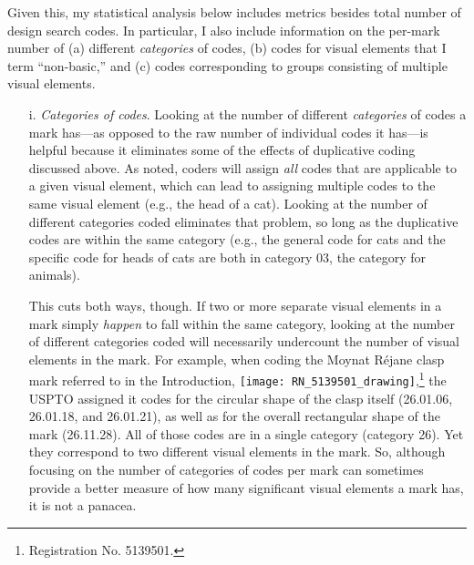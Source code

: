 \documentclass[letterpaper, 11pt, oneside]{article}
\begin{document}
Given this, my statistical analysis below includes metrics besides total number of design search codes. In particular, I also include information on the per-mark number of (a) different \emph{categories} of codes, (b) codes for visual elements that I term ``non-basic,'' and (c) codes corresponding to groups consisting of multiple visual elements.

\begin{enumerate}

\item[i.] \textit{Categories of codes}. Looking at the number of different \emph{categories} of codes a mark has—as opposed to the raw number of individual codes it has—is helpful because it eliminates some of the effects of duplicative coding discussed above. As noted, coders will assign \emph{all} codes that are applicable to a given visual element, which can lead to assigning multiple codes to the same visual element (e.g., the head of a cat). Looking at the number of different categories coded eliminates that problem, so long as the duplicative codes are within the same category (e.g., the general code for cats and the specific code for heads of cats are both in category 03, the category for animals).

This cuts both ways, though. If two or more separate visual elements in a mark simply \emph{happen} to fall within the same category, looking at the number of different categories coded will necessarily undercount the number of visual elements in the mark. For example, when coding the Moynat Réjane clasp mark referred to in the Introduction, \texttt{[image: RN\_5139501\_drawing]},\footnote{Registration No. 5139501.} the USPTO assigned it codes for the circular shape of the clasp itself (26.01.06, 26.01.18, and 26.01.21), as well as for the overall rectangular shape of the mark (26.11.28). All of those codes are in a single category (category 26). Yet they correspond to two different visual elements in the mark. So, although focusing on the number of categories of codes per mark can sometimes provide a better measure of how many significant visual elements a mark has, it is not a panacea.


\end{enumerate}
\end{document}
